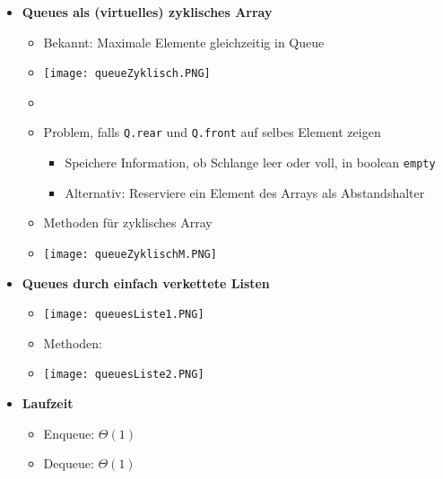 \begin{itemize}
\pagebreak

        \item \textbf{Queues als (virtuelles) zyklisches Array}
            \begin{itemize}
                \item[] Bekannt: Maximale Elemente gleichzeitig in Queue
                \item[] \texttt{[image: queueZyklisch.PNG]} 
                \item[] 
                \item Problem, falls \texttt{Q.rear} und \texttt{Q.front} auf selbes Element zeigen 
                    \begin{itemize}
                        \item Speichere Information, ob Schlange leer oder voll, in boolean \texttt{empty}
                        \item Alternativ: Reserviere ein Element des Arrays als Abstandshalter
                    \end{itemize}
                
                \item Methoden für zyklisches Array
                \item[] \texttt{[image: queueZyklischM.PNG]}
            \end{itemize}

\pagebreak

        \item \textbf{Queues durch einfach verkettete Listen}
            \begin{itemize}
                \item[] \texttt{[image: queuesListe1.PNG]}
                \item[] Methoden:
                \item[] \texttt{[image: queuesListe2.PNG]} 
            \end{itemize}

        \item \textbf{Laufzeit}
            \begin{itemize}
                \item Enqueue: $\Theta(1)$
                \item Dequeue: $\Theta(1)$
            \end{itemize}
    \end{itemize}

\pagebreak

